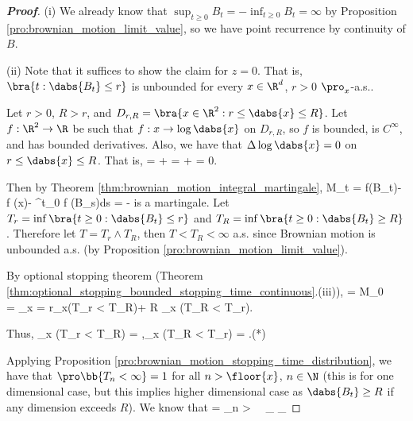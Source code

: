 \begin{proof}[\bf Proof]
\ben
\item [(i)] We already know that $\sup_{t\geq 0} B_t = -\inf_{t\geq 0} B_t = \infty$ by Proposition \ref{pro:brownian_motion_limit_value}, so we have point recurrence by continuity of $B$.

\item [(ii)] Note that it suffices to show the claim for $z= 0$. That is, $\bra{t:\dabs{B_t} \leq r}$ is unbounded for every $x\in \R^d$, $r >0$ $\pro_x$-a.s..

Let $r > 0$, $R > r$, and $D_{r,R} = \bra{x \in \R^2 :r \leq \dabs{x} \leq R}$. Let $f : \R^2 \to \R$ be such that $f : x \to\log\dabs{x}$ on $D_{r,R}$, so $f$ is bounded, is $C^\infty$, and has bounded derivatives. Also, we have that $\Delta \log \dabs{x} = 0$ on $r\leq \dabs{x} \leq R$. %
That is,
\beast%
\Delta \log {} =   +   =  +  = 0.
\eeast

Then by Theorem \ref{thm:brownian_motion_integral_martingale},
\be
M_t = f(B_t)- f (x)- \int^t_0  \Delta f (B_s)ds = \log{} -\log{}
\ee
is a martingale. Let $T_r = \inf\bra{t \geq 0 :\dabs{B_t} \leq r}$ and $T_R = \inf\bra{t \geq 0: \dabs{B_t} \geq R}$. Therefore let $T = T_r \land T_R$, then $T < T_R < \infty$ a.s. since Brownian motion is unbounded a.s. (by Proposition \ref{pro:brownian_motion_limit_value}).

By optional stopping theorem (Theorem \ref{thm:optional_stopping_bounded_stopping_time_continuous}.(iii)),
\be
\E{} = M_0 \ \ra \ \log {} = \E_x = \log r\pro_x(T_r < T_R)+ \log R \pro_x (T_R < T_r).
\ee

Thus,
\be
\pro_x (T_r < T_R) = ,\quad \pro_x (T_R < T_r) = .\quad \quad (*)
\ee

Applying Proposition \ref{pro:brownian_motion_stopping_time_distribution}, we have that $\pro\bb{T_n < \infty}=1$ for all $n > \floor{x}$, $n\in \N$ (this is for one dimensional case, but this implies higher dimensional case as $\dabs{B_t} \geq R$ if any dimension exceeds $R$). We know that
\be
{} = \bigcup_{n > } \cap {} \ \ra \ \ind_{} \ua \ind_{} 
\ee


\end{proof}
